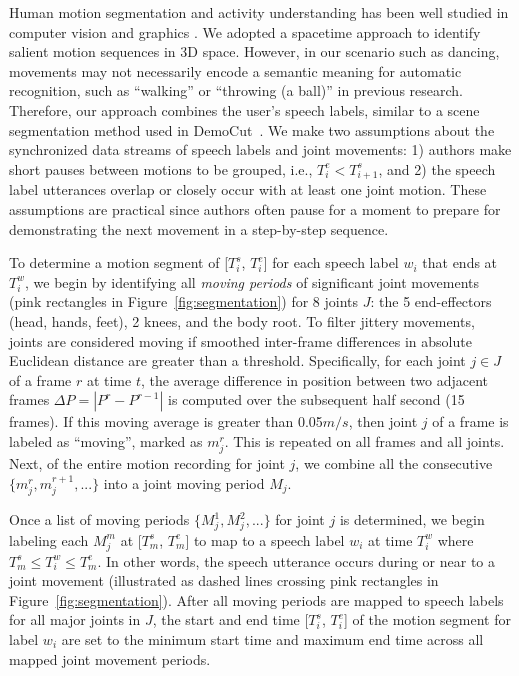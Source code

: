 Human motion segmentation and activity understanding has been well studied in computer vision and graphics \cite{Aggarwal:2011:HAA:1922649.1922653}. We adopted a spacetime approach to identify salient motion sequences in 3D space.
%
However, in our scenario such as dancing, movements may not necessarily encode a semantic meaning for automatic recognition, such as ``walking'' or ``throwing (a ball)'' in previous research. Therefore, our approach combines the user's speech labels, similar to a scene segmentation method used in DemoCut~\cite{Chi:2013:DGC:2501988.2502052}.
%
We make two assumptions about the synchronized data streams of speech labels and joint movements:
1) authors make short pauses between motions to be grouped, i.e., $T_i^e < T_{i+1}^s$, and
2) the speech label utterances overlap or closely occur with at least one joint motion.
%
These assumptions are practical since authors often pause for a moment to prepare for demonstrating the next movement in a step-by-step sequence.

To determine a motion segment of [$T_i^s$, $T_i^e$] for each speech label $w_i$ that ends at $T_i^w$, we begin by identifying all \emph{moving periods} of significant joint movements (pink rectangles in Figure~\ref{fig:segmentation}) for 8 joints $J$: the 5 end-effectors (head, hands, feet), 2 knees, and the body root.
%
To filter jittery movements, joints are considered moving if smoothed inter-frame differences in absolute Euclidean distance are greater than a threshold.
%
Specifically, for each joint $j \in J$ of a frame $r$ at time $t$, the average difference in position between two adjacent frames $\Delta P = |P^r-P^{r-1}|$ is computed over the subsequent half second (15 frames).
%
If this moving average is greater than 0.05$m/s$, then joint $j$ of a frame is labeled as ``moving'', marked as $m_j^r$.
This is repeated on all frames and all joints.
Next, of the entire motion recording for joint $j$, we combine all the consecutive $\{m_j^r, m_j^{r+1}, ...\}$ into a joint moving period $M_j$.

Once a list of moving periods $\{M_j^1, M_j^2, ...\}$ for joint $j$ is determined, we begin labeling each $M_j^m$ at [$T_{m}^s$, $T_{m}^e$] to map to a speech label $w_i$ at time $T_i^w$ where $T_m^s \leq T_i^w \leq T_m^e$. In other words, the speech utterance occurs during or near to a joint movement (illustrated as dashed lines crossing pink rectangles in Figure~\ref{fig:segmentation}).
%
After all moving periods are mapped to speech labels for all major joints in $J$, the start and end time [$T_i^s$, $T_i^e$] of the motion segment for label $w_i$ are set to the minimum start time and maximum end time across all mapped joint movement periods.


